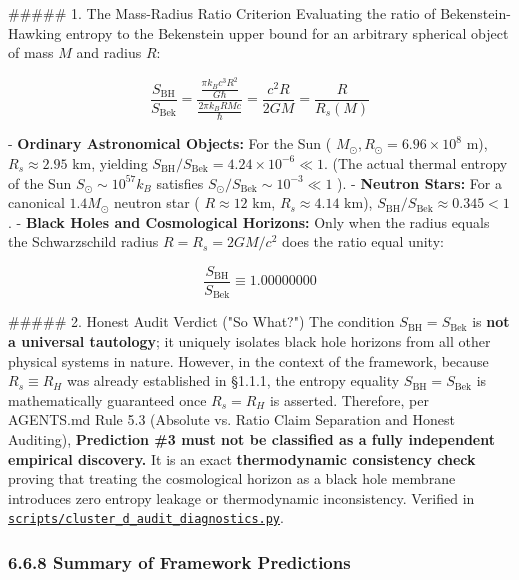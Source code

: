 \documentclass[11pt,a4paper]{article}
\theoremstyle{definition}
\theoremstyle{remark}
\begin{document}
\#\#\#\#\# 1. The Mass-Radius Ratio Criterion
Evaluating the ratio of Bekenstein-Hawking entropy to the Bekenstein upper bound for an arbitrary spherical object of mass $M$ and radius $R$:


\begin{equation}
\frac{S_{\text{BH}}}{S_{\text{Bek}}} = \frac{\frac{\pi k_B c^3 R^2}{G \hbar}}{\frac{2\pi k_B R M c}{\hbar}} = \frac{c^2 R}{2 G M} = \frac{R}{R_s(M)}
\end{equation}


- \textbf{Ordinary Astronomical Objects:} For the Sun ( $M_\odot, R_\odot = 6.96 \times 10^8$ m), $R_s \approx 2.95$ km, yielding $S_{\text{BH}}/S_{\text{Bek}} = 4.24 \times 10^{-6} \ll 1$. (The actual thermal entropy of the Sun $S_\odot \sim 10^{57} k_B$ satisfies $S_\odot / S_{\text{Bek}} \sim 10^{-3} \ll 1$ ).
- \textbf{Neutron Stars:} For a canonical $1.4 M_\odot$ neutron star ( $R \approx 12$ km, $R_s \approx 4.14$ km), $S_{\text{BH}}/S_{\text{Bek}} \approx 0.345 < 1$.
- \textbf{Black Holes and Cosmological Horizons:} Only when the radius equals the Schwarzschild radius $R = R_s = 2GM/c^2$ does the ratio equal unity:


\begin{equation}
\frac{S_{\text{BH}}}{S_{\text{Bek}}} \equiv 1.00000000
\end{equation}


\#\#\#\#\# 2. Honest Audit Verdict ("So What?")
The condition $S_{\text{BH}} = S_{\text{Bek}}$ is \textbf{not a universal tautology}; it uniquely isolates black hole horizons from all other physical systems in nature.
However, in the context of the framework, because $R_s \equiv R_H$ was already established in \S 1.1.1, the entropy equality $S_{\text{BH}} = S_{\text{Bek}}$ is mathematically guaranteed once $R_s = R_H$ is asserted.
Therefore, per AGENTS.md Rule 5.3 (Absolute vs. Ratio Claim Separation and Honest Auditing), \textbf{Prediction \#3 must not be classified as a fully independent empirical discovery.} It is an exact \textbf{thermodynamic consistency check} proving that treating the cosmological horizon as a black hole membrane introduces zero entropy leakage or thermodynamic inconsistency. Verified in \href{../../scripts/cluster_d_audit_diagnostics.py}{\texttt{scripts/cluster_d_audit_diagnostics.py}}.

\subsubsection{6.6.8 Summary of Framework Predictions}
\end{document}
